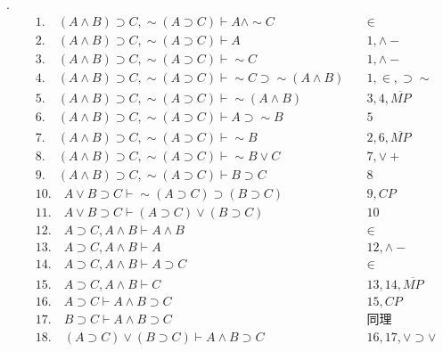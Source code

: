 \documentclass[a4paper]{ctexart}
\begin{document}
.
\begin{align*}
  &1. \quad (A\wedge B)\supset C,\sim(A\supset C) \vdash A\wedge \sim C \quad &\in \\
  &2. \quad (A\wedge B)\supset C,\sim(A\supset C) \vdash A\quad &1,\wedge- \\
  &3. \quad (A\wedge B)\supset C,\sim(A\supset C) \vdash \sim C \quad &1,\wedge- \\
  &4. \quad (A\wedge B)\supset C,\sim(A\supset C) \vdash \sim C\supset \sim(A\wedge B)\quad &1,\in,\supset\sim \\
  &5. \quad (A\wedge B)\supset C,\sim(A\supset C) \vdash \sim(A\wedge B) \quad &3,4,\overline{MP} \\
  &6. \quad (A\wedge B)\supset C,\sim(A\supset C) \vdash A\supset \sim B \quad &5 \\
  &7. \quad (A\wedge B)\supset C,\sim(A\supset C) \vdash \sim B \quad &2,6,\overline{MP} \\
  &8. \quad (A\wedge B)\supset C,\sim(A\supset C) \vdash \sim B\vee C \quad &7,\vee+ \\
  &9. \quad (A\wedge B)\supset C,\sim(A\supset C) \vdash B\supset C \quad &8 \\
  &10. \quad A\vee B\supset C \vdash \sim(A\supset C)\supset(B\supset C) \quad &9,CP \\
  &11. \quad A\vee B\supset C \vdash (A\supset C)\vee (B\supset C) \quad &10 \\
  &12. \quad A\supset C,A\wedge B \vdash A\wedge B \quad &\in \\
  &13. \quad A\supset C,A\wedge B \vdash A \quad &12,\wedge- \\  
  &14. \quad A\supset C,A\wedge B \vdash A\supset C \quad &\in \\
  &15. \quad A\supset C,A\wedge B \vdash C \quad &13,14,\overline{MP} \\
  &16. \quad A\supset C \vdash A\wedge B \supset C\quad &15,CP \\
  &17. \quad B\supset C \vdash A\wedge B \supset C\quad &\text{同理} \\
  &18. \quad (A\supset C)\vee (B\supset C)\vdash  A\wedge B \supset C\quad &16,17,\vee\supset\vee \\
\end{align*}
\end{document}
